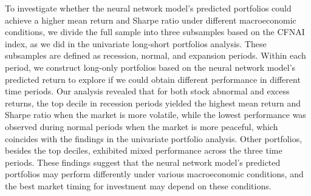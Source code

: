 To investigate whether the neural network model's predicted portfolios could achieve a higher mean return and Sharpe ratio under different macroeconomic conditions, we divide the full sample into three subsamples based on the CFNAI index, as we did in the univariate long-short portfolios analysis. These subsamples are defined as recession, normal, and expansion periods. Within each period, we construct long-only portfolios based on the neural network model's predicted return to explore if we could obtain different performance in different time periods. Our analysis revealed that for both stock abnormal and excess returns, the top decile in recession periods yielded the highest mean return and Sharpe ratio when the market is more volatile, while the lowest performance was observed during normal periods when the market is more peaceful, which coincides with the findings in the univariate portfolio analysis. Other portfolios, besides the top deciles, exhibited mixed performance across the three time periods. These findings suggest that the neural network model's predicted portfolios may perform differently under various macroeconomic conditions, and the best market timing for investment may depend on these conditions.
